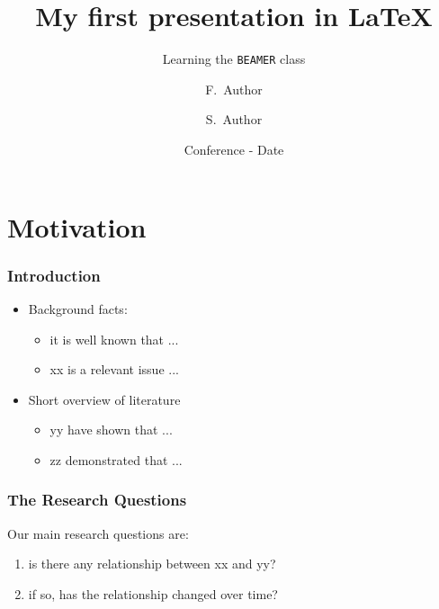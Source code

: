 \documentclass[11pt]{beamer}
\title[Short Title]{My first presentation in \LaTeX}
\subtitle{Learning the \texttt{BEAMER} class}
\author[Author1, Author2] %
{F.~Author\inst{1} \and S.~Author\inst{2}}
\institute[Universities XX and YY] %
{
	\inst{1}%
	Department of F.~Author \\
	University XX
	\and
	\inst{2}%
	Department of S.~Author \\
	University YY}
\date[EDSD 2018-2019] %
{Conference - Date}
\begin{document}
\begin{frame}    %
\titlepage
\end{frame}	

	

\section{Motivation}   %

\begin{frame}          %
\frametitle{Introduction}
\begin{itemize}
\setlength\itemsep{2em}		
\item Background facts:
	\begin{itemize}
	\item it is well known that ...
	\item xx is a relevant issue ...
	\end{itemize}
\item Short overview of literature
	\begin{itemize}
	\item yy have shown that ...
	\item zz demonstrated that ...
	\end{itemize}
\end{itemize}
\end{frame}

\begin{frame}          %
\frametitle{The Research Questions}
Our main research questions are:
\bigskip
\begin{enumerate}
\setlength\itemsep{2em}	
\item is there any relationship between xx and yy?
\item if so, has the relationship changed over time? 
\end{enumerate}
\end{frame}

\end{document}
